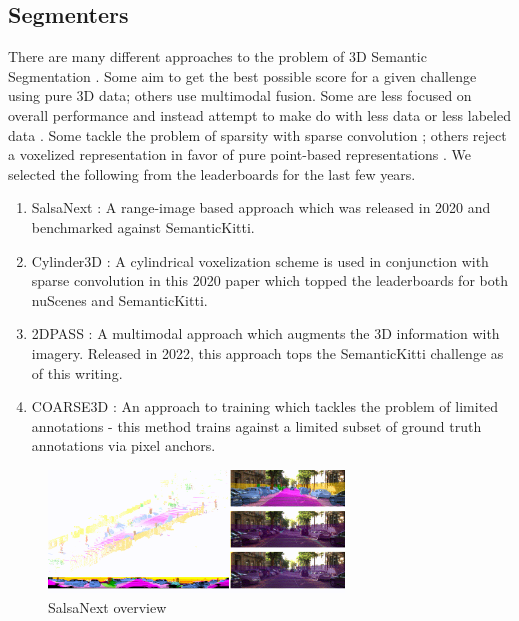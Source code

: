 \subsection{Segmenters}
\label{sec:segmenters}

There are many different approaches to the problem of 3D Semantic Segmentation \cite{deeplearningpcsurvey}. Some aim to get the best possible score for a given challenge using pure 3D data; others use multimodal fusion. Some are less focused on overall performance and instead attempt to make do with less data or less labeled data \cite{2dpass}. Some tackle the problem of sparsity with sparse convolution \cite{sparseconv}; others reject a voxelized representation in favor of pure point-based representations \cite{pointnet}. We selected the following from the leaderboards for the last few years.

\begin{enumerate}
  \item SalsaNext \cite{salsanext}: A range-image based approach which was released in 2020 and benchmarked against SemanticKitti.
  \item Cylinder3D \cite{cylinder3d}: A cylindrical voxelization scheme is used in conjunction with sparse convolution in this 2020 paper which topped the leaderboards for both nuScenes and SemanticKitti.
  \item 2DPASS \cite{2dpass}: A multimodal approach which augments the 3D information with imagery. Released in 2022, this approach tops the SemanticKitti challenge as of this writing.
  \item COARSE3D \cite{coarse3d}: An approach to training which tackles the problem of limited annotations - this method trains against a limited subset of ground truth annotations via pixel anchors.
\end{enumerate}

\begin{figure}[htp]
  \centering
  \includegraphics[width=0.7\textwidth]{images/salsanext_overview.png}
  \caption{SalsaNext overview}
  \label{fig:salsanext-overview}
\end{figure}

